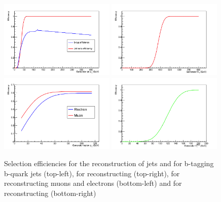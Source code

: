 \begin{figure}[ht!]
\begin{center}
\includegraphics[width=0.49\textwidth]{images/Pheno/BTagEff.png}
\includegraphics[width=0.49\textwidth]{images/Pheno/HTEff.png}\\
\includegraphics[width=0.49\textwidth]{images/Pheno/LeptonEff.png}
\includegraphics[width=0.49\textwidth]{images/Pheno/METEff.png}
\end{center}
\caption{Selection efficiencies for the reconstruction of jets and for b-tagging b-quark jets (top-left), for reconstructing \HT (top-right), for reconstructing muons and electrons (bottom-left) and for reconstructing \MET (bottom-right)}
\label{fig:effGraphs}
\end{figure}

